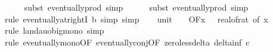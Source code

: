 \begin{isabellebody}
\ \ \ \ \isamarkupfalse%
\ {\isacharparenleft}{\kern0pt}subst\ eventually{\isacharunderscore}{\kern0pt}prod{}{\isacharprime}{\kern0pt}{\isacharcomma}{\kern0pt}\ simp{\isacharparenright}{\kern0pt}\isanewline
\ \ \ \ \isamarkupfalse%
\ {\isacharparenleft}{\kern0pt}subst\ eventually{\isacharunderscore}{\kern0pt}prod{}{\isacharprime}{\kern0pt}{\isacharcomma}{\kern0pt}\ simp{\isacharparenright}{\kern0pt}\isanewline
\ \ \ \ \isamarkupfalse%
\ {\isacharparenleft}{\kern0pt}rule\ eventually{\isacharunderscore}{\kern0pt}at{\isacharunderscore}{\kern0pt}rightI{\isacharbrackleft}{\kern0pt}\ b{\isacharequal}{\kern0pt}{\isachardoublequoteopen}{}{\isachardoublequoteclose}{\isacharbrackright}{\kern0pt}{\isacharcomma}{\kern0pt}\ simp{\isacharcomma}{\kern0pt}\ simp{\isacharparenright}{\kern0pt}\isanewline
\isanewline
\ \ \isamarkupfalse%
\ unit{\isacharunderscore}{\kern0pt}{}{\isacharcolon}{\kern0pt}\ {\isachardoublequoteopen}{\isacharparenleft}{\kern0pt}{\isasymlambda}{\isacharunderscore}{\kern0pt}{\isachardot}{\kern0pt}\ {}{\isacharparenright}{\kern0pt}\ {\isasymin}\ O{\isacharbrackleft}{\kern0pt}{\isacharquery}{\kern0pt}F{\isacharbrackright}{\kern0pt}{\isacharparenleft}{\kern0pt}{\isasymlambda}x{\isachardot}{\kern0pt}\ {}\ {\isacharslash}{\kern0pt}\ {\isacharparenleft}{\kern0pt}real{\isacharunderscore}{\kern0pt}of{\isacharunderscore}{\kern0pt}rat\ {\isacharparenleft}{\kern0pt}{\isasymdelta}{\isacharunderscore}{\kern0pt}of\ x{\isacharparenright}{\kern0pt}{\isacharparenright}{\kern0pt}\isanewline
\ \ \ \ \isamarkupfalse%
\ {\isacharparenleft}{\kern0pt}rule\ landau{\isacharunderscore}{\kern0pt}o{\isachardot}{\kern0pt}big{\isacharunderscore}{\kern0pt}mono{\isacharcomma}{\kern0pt}\ simp{\isacharparenright}{\kern0pt}\isanewline
\ \ \ \ \isamarkupfalse%
\ {\isacharparenleft}{\kern0pt}rule\ eventually{\isacharunderscore}{\kern0pt}mono{\isacharbrackleft}{\kern0pt}OF\ eventually{\isacharunderscore}{\kern0pt}conj{\isacharbrackleft}{\kern0pt}OF\ zero{\isacharunderscore}{\kern0pt}less{\isacharunderscore}{\kern0pt}delta\ delta{\isacharunderscore}{\kern0pt}inf{\isacharbrackleft}{\kern0pt}\ c{\isacharequal}{\kern0pt}{\isachardoublequoteopen}{}{\isachardoublequoteclose}{\isacharbrackright}{\kern0pt}{\isacharbrackright}{\kern0pt}{\isacharbrackright}{\kern0pt}{\isacharparenright}{\kern0pt}\isanewline

\end{isabellebody}
